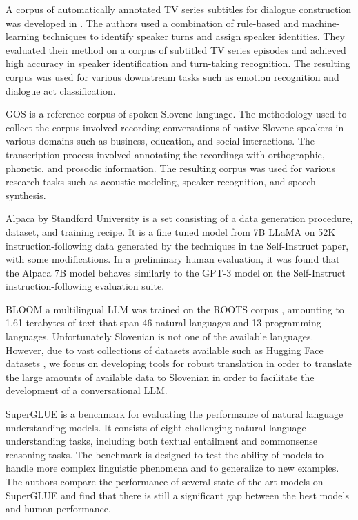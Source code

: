\documentclass[fleqn,moreauthors,10pt]{ds_report}
\begin{document}
A corpus of automatically annotated TV series subtitles for dialogue construction was developed in \cite{tv_series_subtitles}. The authors used a combination of rule-based and machine-learning techniques to identify speaker turns and assign speaker identities. They evaluated their method on a corpus of subtitled TV series episodes and achieved high accuracy in speaker identification and turn-taking recognition. The resulting corpus was used for various downstream tasks such as emotion recognition and dialogue act classification.

GOS \cite{Verdonik2013} is a reference corpus of spoken Slovene language. The methodology used to collect the corpus involved recording conversations of native Slovene speakers in various domains such as business, education, and social interactions. The transcription process involved annotating the recordings with orthographic, phonetic, and prosodic information. The resulting corpus was used for various research tasks such as acoustic modeling, speaker recognition, and speech synthesis. 

Alpaca \cite{alpaca} by Standford University is a set consisting of a data generation procedure, dataset, and training recipe. It is a fine tuned model from 7B LLaMA \cite{touvron2023llama} on 52K instruction-following data generated by the techniques in the Self-Instruct \cite{wang2022selfinstruct} paper, with some modifications. In a preliminary human evaluation, it was found that the Alpaca 7B model behaves similarly to the GPT-3 model on the Self-Instruct instruction-following evaluation suite.

BLOOM \cite{scao2022bloom} a multilingual LLM  was trained on the ROOTS corpus \cite{roots}, amounting to 1.61 terabytes of text that span 46 natural languages and 13 programming languages. Unfortunately Slovenian is not one of the available languages. However, due to vast collections of datasets available such as  Hugging Face datasets \cite{lhoest2021datasets}, we focus on developing tools for robust translation in order to translate the large amounts of available data to Slovenian in order to facilitate the development of a conversational LLM.


SuperGLUE \cite{wang2019superglue} is a benchmark for evaluating the performance of natural language understanding models. It consists of eight challenging natural language understanding tasks, including both textual entailment and commonsense reasoning tasks. The benchmark is designed to test the ability of models to handle more complex linguistic phenomena and to generalize to new examples. The authors compare the performance of several state-of-the-art models on SuperGLUE and find that there is still a significant gap between the best models and human performance.
\end{document}

